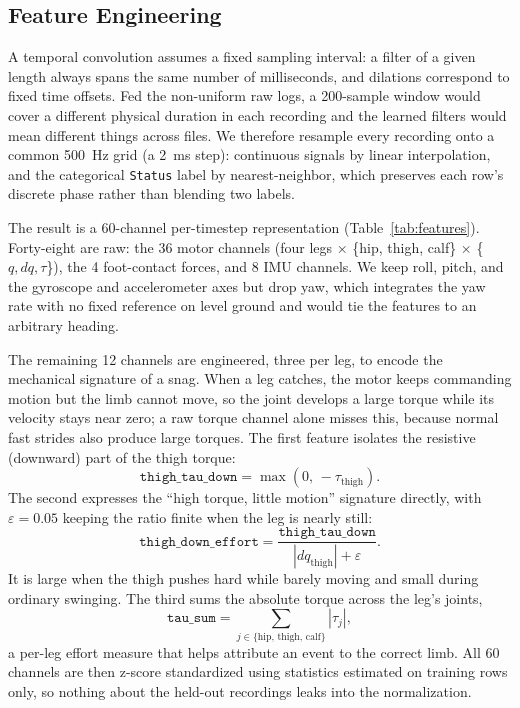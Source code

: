 \documentclass[conference]{IEEEtran}
\begin{document}
\subsection{Feature Engineering}
\label{sec:feat}

A temporal convolution assumes a fixed sampling interval: a filter of a given length always spans the same number of milliseconds, and dilations correspond to fixed time offsets. Fed the non-uniform raw logs, a 200-sample window would cover a different physical duration in each recording and the learned filters would mean different things across files. We therefore resample every recording onto a common 500~Hz grid (a 2~ms step): continuous signals by linear interpolation, and the categorical \texttt{Status} label by nearest-neighbor, which preserves each row's discrete phase rather than blending two labels.

The result is a 60-channel per-timestep representation (Table~\ref{tab:features}). Forty-eight are raw: the 36 motor channels (four legs $\times$ \{hip, thigh, calf\} $\times$ \{$q,dq,\tau$\}), the 4 foot-contact forces, and 8 IMU channels. We keep roll, pitch, and the gyroscope and accelerometer axes but drop yaw, which integrates the yaw rate with no fixed reference on level ground and would tie the features to an arbitrary heading.

The remaining 12 channels are engineered, three per leg, to encode the mechanical signature of a snag. When a leg catches, the motor keeps commanding motion but the limb cannot move, so the joint develops a large torque while its velocity stays near zero; a raw torque channel alone misses this, because normal fast strides also produce large torques. The first feature isolates the resistive (downward) part of the thigh torque:
\begin{equation}
\texttt{thigh\_tau\_down} = \max(0,\, -\tau_{\text{thigh}}).
\end{equation}
The second expresses the ``high torque, little motion'' signature directly, with $\varepsilon = 0.05$ keeping the ratio finite when the leg is nearly still:
\begin{equation}
\texttt{thigh\_down\_effort} = \frac{\texttt{thigh\_tau\_down}}{|dq_{\text{thigh}}| + \varepsilon}.
\end{equation}
It is large when the thigh pushes hard while barely moving and small during ordinary swinging. The third sums the absolute torque across the leg's joints,
\begin{equation}
\texttt{tau\_sum} = \sum_{j \in \{\text{hip},\,\text{thigh},\,\text{calf}\}} |\tau_j|,
\end{equation}
a per-leg effort measure that helps attribute an event to the correct limb. All 60 channels are then z-score standardized using statistics estimated on training rows only, so nothing about the held-out recordings leaks into the normalization.
\end{document}
